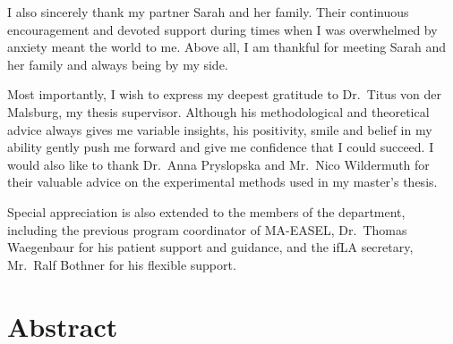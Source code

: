 \documentclass[
]{article}
\begin{document}
I also sincerely thank my partner Sarah and her family. Their continuous
encouragement and devoted support during times when I was overwhelmed by
anxiety meant the world to me. Above all, I am thankful for meeting
Sarah and her family and always being by my side.

Most importantly, I wish to express my deepest gratitude to Dr.~Titus
von der Malsburg, my thesis supervisor. Although his methodological and
theoretical advice always gives me variable insights, his positivity,
smile and belief in my ability gently push me forward and give me
confidence that I could succeed. I would also like to thank Dr.~Anna
Pryslopska and Mr.~Nico Wildermuth for their valuable advice on the
experimental methods used in my master's thesis.

Special appreciation is also extended to the members of the department,
including the previous program coordinator of MA-EASEL, Dr.~Thomas
Waegenbaur for his patient support and guidance, and the ifLA secretary,
Mr.~Ralf Bothner for his flexible support.

\clearpage
\thispagestyle{plain}  
\section*{Abstract}
\vspace*{1.5cm}
\end{document}
